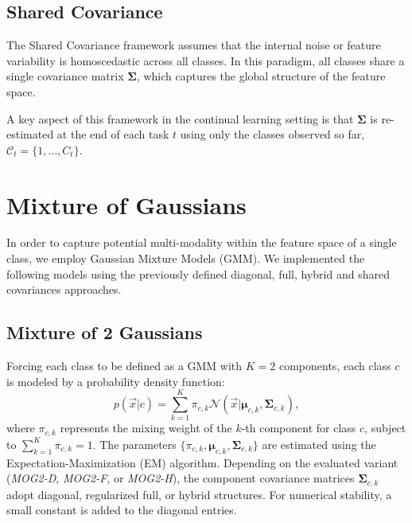 \subsection{Shared Covariance}
\label{subsec:shared_cov_original}

The Shared Covariance framework assumes that the internal noise or feature variability is homoscedastic across all classes. In this paradigm, all classes share a single covariance matrix $\boldsymbol{\Sigma}$, which captures the global structure of the feature space.

A key aspect of this framework in the continual learning setting is that $\boldsymbol{\Sigma}$ is re-estimated at the end of each task $t$ using only the classes observed so far, $\mathcal{C}_t = \{1, \dots, C_t\}$.

\section{Mixture of Gaussians}

In order to capture potential multi-modality within the feature space of a single class, we employ Gaussian Mixture Models (GMM). We implemented the following models using the previously defined diagonal, full, hybrid and shared covariances approaches.

\subsection{Mixture of 2 Gaussians}

Forcing each class to be defined as a GMM with $K=2$ components, each class $c$ is modeled by a probability density function:
\begin{equation}
	p(\vec{x}|c) = \sum_{k=1}^{K} \pi_{c,k} \mathcal{N}(\vec{x} | \boldsymbol{\mu}_{c,k}, \boldsymbol{\Sigma}_{c,k}),
\end{equation}
where $\pi_{c,k}$ represents the mixing weight of the $k$-th component for class $c$, subject to $\sum_{k=1}^{K} \pi_{c,k} = 1$. The parameters $\{\pi_{c,k}, \boldsymbol{\mu}_{c,k}, \boldsymbol{\Sigma}_{c,k}\}$ are estimated using the Expectation-Maximization (EM) algorithm. Depending on the evaluated variant (\textit{MOG2-D}, \textit{MOG2-F}, or \textit{MOG2-H}), the component covariance matrices $\boldsymbol{\Sigma}_{c,k}$ adopt diagonal, regularized full, or hybrid structures. For numerical stability, a small constant is added to the diagonal entries.

